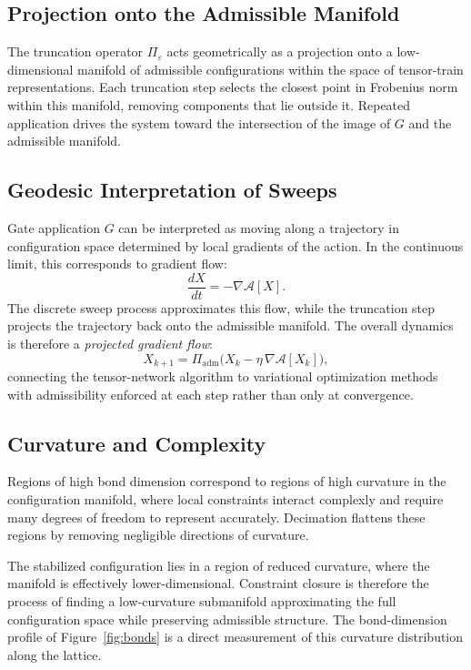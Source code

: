 \documentclass[11pt]{article}
\theoremstyle{definition}
\begin{document}
\subsection{Projection onto the Admissible Manifold}

The truncation operator $\Pi_\varepsilon$ acts geometrically as a projection
onto a low-dimensional manifold of admissible configurations within the space
of tensor-train representations. Each truncation step selects the closest point
in Frobenius norm within this manifold, removing components that lie outside
it. Repeated application drives the system toward the intersection of the image
of $G$ and the admissible manifold.

\subsection{Geodesic Interpretation of Sweeps}

Gate application $G$ can be interpreted as moving along a trajectory in
configuration space determined by local gradients of the action. In the
continuous limit, this corresponds to gradient flow:
\begin{equation}
  \frac{dX}{dt} = -\nabla \mathcal{A}[X].
\end{equation}
The discrete sweep process approximates this flow, while the truncation step
projects the trajectory back onto the admissible manifold. The overall dynamics
is therefore a \emph{projected gradient flow}:
\begin{equation}
  X_{k+1} = \Pi_{\mathrm{adm}}\!\bigl(X_k - \eta\,\nabla \mathcal{A}[X_k]\bigr),
  \label{eq:proj_grad}
\end{equation}
connecting the tensor-network algorithm to variational optimization methods
with admissibility enforced at each step rather than only at convergence.

\subsection{Curvature and Complexity}

Regions of high bond dimension correspond to regions of high curvature in the
configuration manifold, where local constraints interact complexly and require
many degrees of freedom to represent accurately. Decimation flattens these
regions by removing negligible directions of curvature.

The stabilized configuration lies in a region of reduced curvature, where the
manifold is effectively lower-dimensional. Constraint closure is therefore the
process of finding a low-curvature submanifold approximating the full
configuration space while preserving admissible structure. The bond-dimension
profile of Figure~\ref{fig:bonds} is a direct measurement of this curvature
distribution along the lattice.
\end{document}
